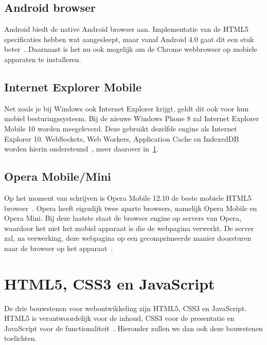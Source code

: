 \subsection{Android browser}
\label{sec:android-browser}
Android biedt de native Android browser aan. Implementatie van de HTML5 specificaties hebben wat aangesleept, maar vanaf Android 4.0 gaat dit een stuk beter~\cite{Hales2012}. Daarnaast is het nu ook mogelijk om de Chrome webbrowser op mobiele apparaten te installeren.

\subsection{Internet Explorer Mobile}
Net zoals je bij Windows ook Internet Explorer krijgt, geldt dit ook voor hun mobiel  besturingssysteem. Bij de nieuwe Windows Phone 8 zal Internet Explorer Mobile 10 worden meegeleverd. Deze gebruikt dezelfde engine als Internet Explorer 10. WebSockets, Web Workers, Application Cache en IndexedDB worden hierin ondersteund~\cite{Hales2012}, meer daarover in~\ref{sec:html5-css3-js}.

\subsection{Opera Mobile/Mini}
Op het moment van schrijven is Opera Mobile 12.10 de beste mobiele HTML5 browser~\cite{Sights2012}. Opera heeft eigenlijk twee aparte browsers, namelijk Opera Mobile en Opera Mini. Bij deze laatste staat de browser engine op servers van Opera, waardoor het niet het mobiel apparaat is die de webpagina verwerkt. De server zal, na verwerking, deze webpagina op een gecomprimeerde manier doorsturen naar de browser op het apparaat~\cite{PhilDutson2012}.



\section{HTML5, CSS3 en JavaScript}
\label{sec:html5-css3-js}
De drie bouwstenen voor webontwikkeling zijn HTML5, CSS3 en JavaScript. HTML5 is verantwoordelijk voor de inhoud, CSS3 voor de presentatie en JavaScript voor de functionaliteit~\cite{PhilDutson2012}. Hieronder zullen we dan ook deze bouwstenen toelichten.

